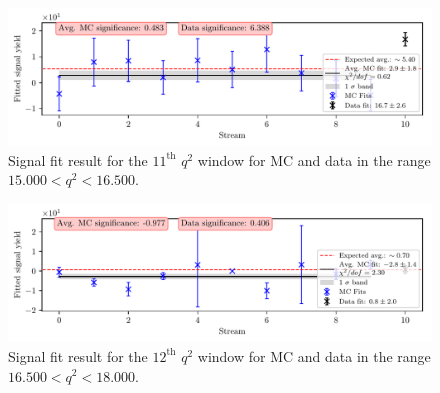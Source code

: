 \begin{figure}[H]
	\centering
	\captionsetup{width=0.8\linewidth}
	\includegraphics[width=\linewidth]{fig/sig_q2_11}
	\caption{Signal fit result for the $11^{\mathrm{th}}$ $q^2$ window for MC and data in the range $15.000  < q^2 < 16.500$.}
\end{figure}

\begin{figure}[H]
	\centering
	\captionsetup{width=0.8\linewidth}
	\includegraphics[width=\linewidth]{fig/sig_q2_12}
	\caption{Signal fit result for the $12^{\mathrm{th}}$ $q^2$ window for MC and data in the range $16.500  < q^2 < 18.000$.}
\end{figure}